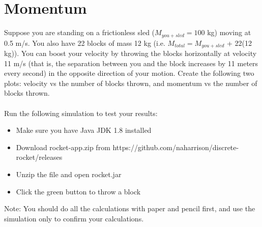 \section{Momentum}

Suppose you are standing on a frictionless sled ($M_{you+sled} = 100$ kg) moving at 0.5 m/s.
You also have 22 blocks of mass 12 kg (i.e. $M_{total} = M_{you+sled}$ + 22(12 kg)).
You can boost your velocity by throwing the blocks horizontally at velocity 11 m/s (that is, the separation between you and the block increases by 11 meters every second) in the opposite direction of your motion.
Create the following two plots: velocity vs the number of blocks thrown, and momentum vs the number of blocks thrown. \\~\\
%
Run the following simulation to test your results:
\begin{itemize}
\item Make sure you have Java JDK 1.8 installed
\item Download rocket-app.zip from https://github.com/naharrison/discrete-rocket/releases
\item Unzip the file and open rocket.jar
\item Click the green button to throw a block
\end{itemize}

Note: You should do all the calculations with paper and pencil first, and use the simulation only to confirm your calculations.

\pagebreak \clearpage
